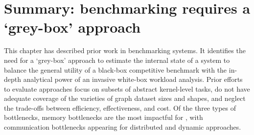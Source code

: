 \section{Summary: \gai benchmarking requires a `grey-box' approach}
This chapter has described prior work in benchmarking \gai systems. 
It identifies the need for a `grey-box' approach to estimate the internal state of a system to balance the general utility of a black-box competitive benchmark with the in-depth analytical power of an invasive white-box workload analysis. 
Prior efforts to evaluate \gai approaches focus on subsets of abstract kernel-level tasks, do not have adequate coverage of the varieties of graph dataset sizes and shapes, and neglect the trade-offs between efficiency, effectiveness, and cost. 
Of the three types of bottlenecks, memory bottlenecks are the most impactful for \gai, with communication bottlenecks appearing for distributed and dynamic \gai approaches. 





